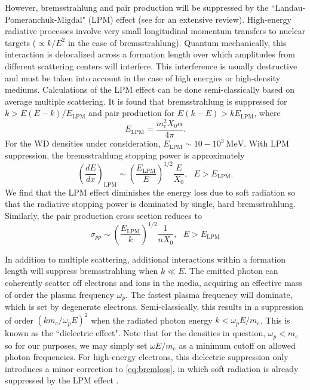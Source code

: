 \documentclass[twocolumn,showpacs,preprintnumbers,amsmath,amssymb,prd]{revtex4}
\def\r{\right)}
\def\l{\left(}
\begin{document}
\begin{appendices}
However, bremsstrahlung and pair production will be suppressed by the ``Landau-Pomeranchuk-Migdal" (LPM) effect (see \cite{Klein:1998du} for an extensive review). High-energy radiative processes involve very small longitudinal momentum transfers to nuclear targets ($\propto k/E^2$ in the case of bremsstrahlung). Quantum mechanically, this interaction is delocalized across a formation length over which amplitudes from different scattering centers will interfere. This interference is usually destructive and must be taken into account in the case of high energies or high-density mediums. Calculations of the LPM effect can be done semi-classically based on average multiple scattering. It is found that bremsstrahlung is suppressed for $k > E(E-k)/E_\text{LPM}$ and pair production for $E(k-E) > k E_\text{LPM}$, where
\begin{equation}
\label{eq:LPM}
E_\text{LPM} = \frac{m_e^2 X_0 \alpha}{4 \pi}.
\end{equation}
For the WD densities under consideration, $E_\text{LPM} \sim 10-10^{3} ~\text{MeV}$. With LPM suppression, the bremsstrahlung stopping power is approximately
\begin{equation}
\label{eq:bremloss}
\l\frac{dE}{dx}\r_\text{LPM} \sim \l\frac{E_\text{LPM}}{E} \r^{1/2} \frac{E}{X_0}, ~~~ E>E_\text{LPM}.
\end{equation}
We find that the LPM effect diminishes the energy loss due to soft radiation so that the radiative stopping power is dominated by single, hard bremsstrahlung. Similarly, the pair production cross section reduces to
\begin{equation}
\sigma_{pp} \sim \l\frac{E_\text{LPM}}{k} \r^{1/2} \frac{1}{n X_0}, ~~~ E>E_\text{LPM}
\end{equation}

In addition to multiple scattering, additional interactions within a formation length will suppress bremsstrahlung when $k \ll E$. The emitted photon can coherently scatter off electrons and ions in the media, acquiring an effective mass of order the plasma frequency $\omega_p$. The fastest plasma frequency will dominate, which is set by degenerate electrons.
Semi-classically, this results in a suppression of order $(k m_e/\omega_p E)^2$ when the radiated photon energy $k < \omega_p E/m_e$. This is known as the ``dielectric effect". Note that for the densities in question, $\omega_p < m_e$ so for our purposes, we may simply set $\omega E/m_e$ as a minimum cutoff on allowed photon frequencies. For high-energy electrons, this dielectric suppression only introduces a minor correction to \eqref{eq:bremloss}, in which soft radiation is already suppressed by the LPM effect \cite{Klein:1998du}. 


\end{appendices}
\end{document}
